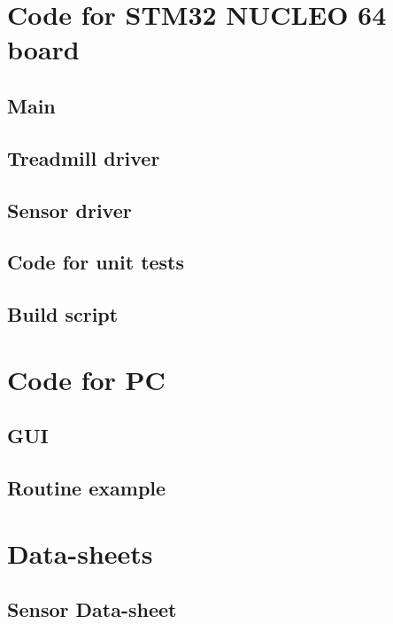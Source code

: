 \documentclass[12pt,a4paper, twoside]{article}
\begin{document}
\section{Code for STM32 NUCLEO 64 board}
\subsection{Main}


\subsection{Treadmill driver}


\subsection{Sensor driver}


\subsection{Code for unit tests}








\subsection{Build script}


\section{Code for PC}
\subsection{GUI}

\subsection{Routine example}

\section{Data-sheets}
\subsection{Sensor Data-sheet }\label{app:PMW3660}

%
\end{document}
